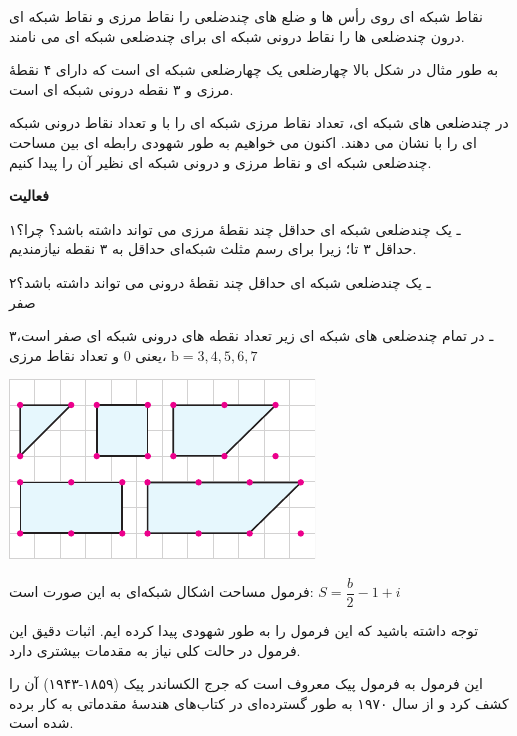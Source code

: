 \documentclass[12pt, a4paper]{book}
\begin{document}
نقاط شبکه ای روی رأس ها و ضلع های چندضلعی را نقاط مرزی و نقاط شبکه ای درون چندضلعی ها را نقاط درونی شبکه ای برای چندضلعی شبکه ای می نامند.

به طور مثال در شکل بالا چهارضلعی 
یک چهارضلعی شبکه ای است که دارای ۴ نقطهٔ مرزی و ٣ نقطه درونی شبکه ای است.
\bigskip

در چندضلعی های شبکه ای، تعداد نقاط مرزی شبکه ای را با
و تعداد نقاط درونی شبکه ای را با
نشان می دهند. اکنون می خواهیم به طور شهودی رابطه ای بین مساحت چندضلعی شبکه ای و نقاط مرزی و درونی شبکه ای نظیر آن را پیدا کنیم.
\bigskip

\textbf{فعالیت}

۱ـ یک چندضلعی شبکه ای حداقل چند نقطهٔ مرزی می تواند داشته باشد؟ چرا؟ \\
حداقل ۳ تا؛ زیرا برای رسم مثلث شبکه‌ای حداقل به ۳ نقطه نیازمندیم.




\begin{minipage}{0.68\textwidth}
	۲ـ یک چندضلعی شبکه ای حداقل چند نقطهٔ درونی می تواند داشته باشد؟ \\
	 صفر
	
	۳ـ در تمام چندضلعی های شبکه ای زیر تعداد نقطه های درونی شبکه ای صفر است، یعنی
	0
	و تعداد نقاط مرزی، 
	$\mbox{b} = 3 , 4, 5, 6 , 7$
\end{minipage}   
\begin{minipage}{.32\textwidth}
	\begin{flushleft}
		\includegraphics{"Shapes/Fasl - 3/Dars 2/P70-S1.pdf"}
	\end{flushleft}
\end{minipage}

فرمول مساحت اشکال شبکه‌ای به این صورت است: 
$S = \dfrac{b}{2} -1 + i$

توجه داشته باشید که این فرمول را به طور شهودی پیدا کرده ایم. اثبات دقیق این فرمول در حالت کلی نیاز به مقدمات بیشتری دارد.

این فرمول به فرمول {\medium پیک} معروف است که جرج الکساندر پیک (۱۸۵۹-۱۹۴۳) آن را کشف کرد و از سال ۱۹۷۰ به طور گسترده‌ای در کتاب‌های هندسهٔ مقدماتی به کار برده شده است.
\end{document}
